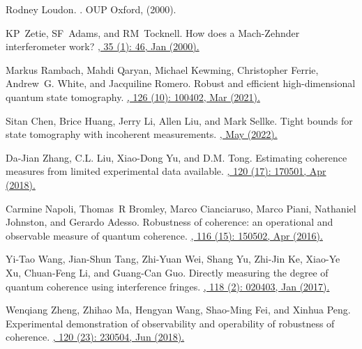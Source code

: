 \documentclass[a4paper,twocolumn,11pt,accepted=2024-01-17]{quantumarticle}
\begin{document}
\begin{thebibliography}{100}
Rodney Loudon.
.
\newblock OUP Oxford, (2000).

KP~Zetie, SF~Adams, and RM~Tocknell.
\newblock How does a {M}ach-{Z}ehnder interferometer work?
\href{http://dx.doi.org/10.1088/0031-9120/35/1/308}{, 35 (1): 46, Jan (2000).}


Markus Rambach, Mahdi Qaryan, Michael Kewming, Christopher Ferrie, Andrew~G.
  White, and Jacquiline Romero.
\newblock Robust and efficient high-dimensional quantum state tomography.
\href{https://doi.org/10.1103/PhysRevLett.126.100402}{, 126 (10): 100402, Mar (2021).}

Sitan Chen, Brice Huang, Jerry Li, Allen Liu, and Mark Sellke.
\newblock Tight bounds for state tomography with incoherent measurements.
\href{https://doi.org/10.48550/arXiv.2206.05265}{, May (2022).}

Da-Jian Zhang, C.L. Liu, Xiao-Dong Yu, and D.M. Tong.
\newblock Estimating coherence measures from limited experimental data  available.
\href{https://doi.org/10.1103/PhysRevLett.120.170501}{, 120 (17): 170501, Apr (2018).}

Carmine Napoli, Thomas~R Bromley, Marco Cianciaruso, Marco Piani, Nathaniel
  Johnston, and Gerardo Adesso.
\newblock Robustness of coherence: an operational and observable measure of
  quantum coherence.
\href{https://doi.org/10.1103/PhysRevLett.116.150502}{, 116 (15): 150502, Apr (2016).}

Yi-Tao Wang, Jian-Shun Tang, Zhi-Yuan Wei, Shang Yu, Zhi-Jin Ke, Xiao-Ye Xu,
  Chuan-Feng Li, and Guang-Can Guo.
\newblock Directly measuring the degree of quantum coherence using interference  fringes.
\href{https://doi.org/10.1103/PhysRevLett.118.020403}{, 118 (2): 020403, Jan (2017).}

Wenqiang Zheng, Zhihao Ma, Hengyan Wang, Shao-Ming Fei, and Xinhua Peng.
\newblock Experimental demonstration of observability and operability of  robustness of coherence.
\href{https://doi.org/10.1103/PhysRevLett.120.230504}{, 120 (23): 230504, Jun (2018).}


\end{thebibliography}
\end{document}
